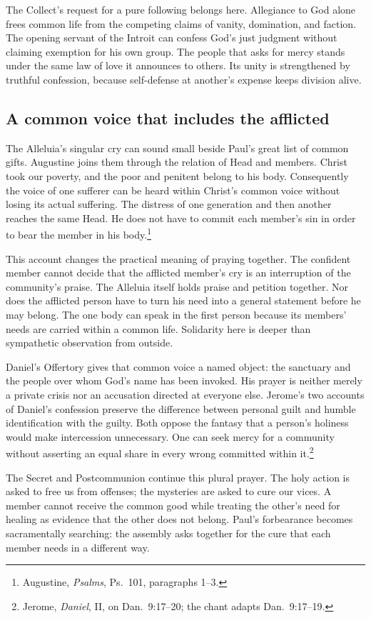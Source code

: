 The Collect's request for a pure following belongs here. Allegiance to God alone frees common life from the competing claims of vanity, domination, and faction. The opening servant of the Introit can confess God's just judgment without claiming exemption for his own group. The people that asks for mercy stands under the same law of love it announces to others. Its unity is strengthened by truthful confession, because self-defense at another's expense keeps division alive.

\subsection{A common voice that includes the afflicted}
The Alleluia's singular cry can sound small beside Paul's great list of common gifts. Augustine joins them through the relation of Head and members. Christ took our poverty, and the poor and penitent belong to his body. Consequently the voice of one sufferer can be heard within Christ's common voice without losing its actual suffering. The distress of one generation and then another reaches the same Head. He does not have to commit each member's sin in order to bear the member in his body.\footnote{Augustine, \textit{Psalms}, Ps.~101, paragraphs 1--3.}

This account changes the practical meaning of praying together. The confident member cannot decide that the afflicted member's cry is an interruption of the community's praise. The Alleluia itself holds praise and petition together. Nor does the afflicted person have to turn his need into a general statement before he may belong. The one body can speak in the first person because its members' needs are carried within a common life. Solidarity here is deeper than sympathetic observation from outside.

Daniel's Offertory gives that common voice a named object: the sanctuary and the people over whom God's name has been invoked. His prayer is neither merely a private crisis nor an accusation directed at everyone else. Jerome's two accounts of Daniel's confession preserve the difference between personal guilt and humble identification with the guilty. Both oppose the fantasy that a person's holiness would make intercession unnecessary. One can seek mercy for a community without asserting an equal share in every wrong committed within it.\footnote{Jerome, \textit{Daniel}, II, on Dan.~9:17--20; the chant adapts Dan.~9:17--19.}

The Secret and Postcommunion continue this plural prayer. The holy action is asked to free us from offenses; the mysteries are asked to cure our vices. A member cannot receive the common good while treating the other's need for healing as evidence that the other does not belong. Paul's forbearance becomes sacramentally searching: the assembly asks together for the cure that each member needs in a different way.

